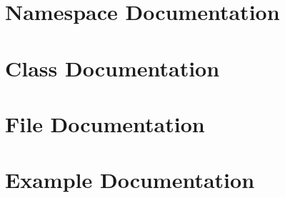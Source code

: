 \documentclass{book}
\begin{document}
\chapter{Namespace Documentation}




\chapter{Class Documentation}


























\chapter{File Documentation}










\chapter{Example Documentation}

\printindex
\end{document}

